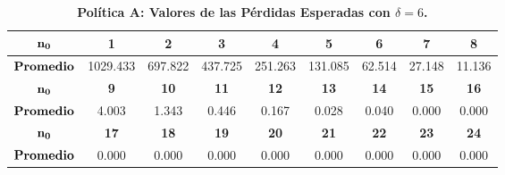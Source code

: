 
\begin{table}[h!]\small
\centering
\caption{\bf Pol\'itica A: Valores de las P\'erdidas Esperadas con $\delta=6$.}\label{c1}
\vspace{0.3 cm}\begin{tabular}{ccccccccc}
\toprule[0.6mm]

$\bf{n_0}$&\bf{1} &                   \bf{2} &                   \bf{3} &                   \bf{ 4 }&                    \bf{ 5}&              \bf{ 6} &               \bf{ 7} & \bf{8} \\
\hline
$\mbox{\bf Promedio}$&1029.433  &697.822&  437.725&  251.263 & 131.085 &  62.514 &  27.148 &  11.136 \\	
\hline
$\bf{n_0}$&\bf{9} &                \bf{ 10}&              \bf{      11} &                   \bf{ 12} &               \bf{      13}&              \bf{14} &  \bf{ 15} & \bf{16 }   \\
\hline
$\mbox{\bf Promedio}$&	 4.003  &  1.343 &   0.446 &   0.167&    0.028 &   0.040 &   0.000&    0.000\\ 
	 \hline
	
$\bf{n_0}$&\bf{17} &     \bf{ 18}&   \bf{19}&   \bf{ 20} &           \bf{   21}&                \bf{  22}  & \bf{23} & \bf{24}  \\
\hline
$\mbox{\bf Promedio}$&  0.000 &   0.000&    0.000 &   0.000   & 0.000  &  0.000 &   0.000 & 0.000\\
\toprule[0.6mm]
\end{tabular}

\end{table}

